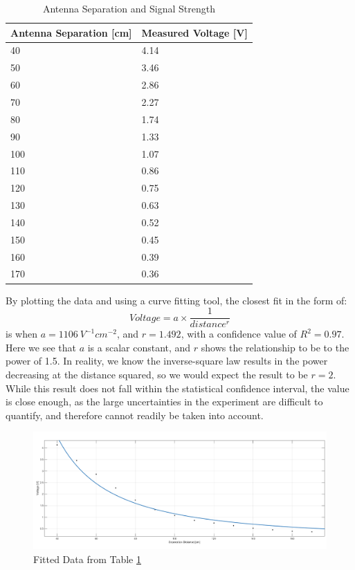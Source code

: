 \documentclass[11pt,a4paper]{article}
\begin{document}
\begin{table}[H]
\centering
\caption{Antenna Separation and Signal Strength}
\label{tab:1.2_results}
\begin{tabular}{| l | l |}
  \hline
\textbf{Antenna Separation [cm]} & \textbf{Measured Voltage [V]}\\ \hline
40  & 4.14 \\ \hline
50  & 3.46 \\ \hline
60  & 2.86 \\ \hline
70  & 2.27 \\ \hline
80  & 1.74 \\ \hline
90  & 1.33 \\ \hline
100 & 1.07 \\ \hline
110 & 0.86 \\ \hline
120 & 0.75 \\ \hline
130 & 0.63 \\ \hline
140 & 0.52 \\ \hline
150 & 0.45 \\ \hline
160 & 0.39 \\ \hline
170 & 0.36 \\ \hline
\end{tabular}
\end{table}

By plotting the data and using a curve fitting tool, the closest fit in the form of:
\begin{equation}
Voltage = a \times \frac{1}{distance^r}
\end{equation}
 is when $a = 1106 \: V^{-1}cm^{-2}$, and $r = 1.492$, with a confidence value of $R^2 =  0.97$. Here we see that $a$ is a scalar constant, and $r$ shows the relationship to be to the power of 1.5. In reality, we know the inverse-square law results in the power decreasing at the distance squared, so we would expect the result to be $r=2$. While this result does not fall within the statistical confidence interval, the value is close enough, as the large uncertainties in the experiment are difficult to quantify, and therefore cannot readily be taken into account. \\

\begin{figure}[H]
\begin{center}
\includegraphics[width=\textwidth]{curve_fit_1_2.png}
\caption{Fitted Data from Table \ref{tab:1.2_results}}
\label{fig:fit_1.2}
\end{center}
\end{figure}
\end{document}
